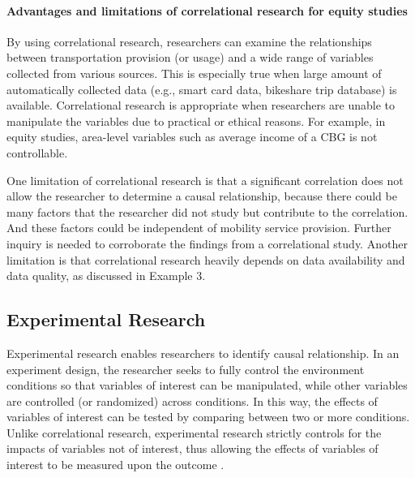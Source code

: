 \documentclass[11pt]{article}
\begin{document}
\paragraph{Advantages and limitations of correlational research for equity studies}
By using correlational research, researchers can examine the relationships between transportation provision (or usage) and a wide range of variables collected from various sources. This is especially true when large amount of automatically collected data (e.g., smart card data, bikeshare trip database) is available.  Correlational research is appropriate when researchers are unable to manipulate the variables due to practical or ethical reasons. For example, in equity studies, area-level variables such as average income of a CBG is not controllable. 

One limitation of correlational research is that a significant correlation does not allow the researcher to determine a causal relationship, because there could be many factors that the researcher did not study but contribute to the correlation. And these factors could be independent of mobility service provision. Further inquiry is needed to corroborate the findings from a correlational study. Another limitation is that correlational research heavily depends on data availability and data quality, as discussed in Example 3. 
\subsection{Experimental Research}
Experimental research enables researchers to identify causal relationship. In an experiment design, the researcher seeks to fully control the environment conditions so that variables of interest can be manipulated, while other variables are controlled (or randomized) across conditions. In this way, the effects of variables of interest can be tested by comparing between two or more conditions. Unlike correlational research, experimental research strictly controls for the impacts of variables not of interest, thus allowing the effects of variables of interest to be measured upon the outcome \cite{lazar2017research}. 
\end{document}
